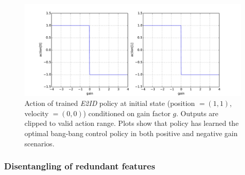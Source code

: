\documentclass{article}
\newcommand{\embed}{\emph{E2ID}}
\begin{document}
\begin{figure}
\centering
\includegraphics[width=0.85 \textwidth]{pointmass_conditional_action.pdf}
\caption{
Action of trained \embed{} policy at initial state (position $ = (1,1)$, velocity $=(0,0)$) conditioned on gain factor $g$.
Outputs are clipped to valid action range.
Plots show that policy has learned the optimal bang-bang control policy in both positive and negative gain scenarios.
}
\label{fig:conditional_action}
\end{figure}

\subsubsection{Disentangling of redundant features}
\end{document}
